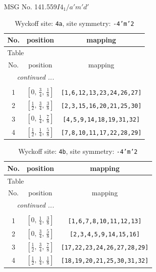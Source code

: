 \documentclass[fleqn,8pt]{jsarticle}
\begin{document}
\setcounter{MaxMatrixCols}{32}

\renewcommand{\tablename}{Table~}
\renewcommand{\figurename}{Figure~}
\begin{center}
\LARGE
MSG No. 141.559\quad$I4_{1}/a'm'd'$
\end{center}
\renewcommand{\arraystretch}{1.2}
\begin{longtable}{ccc}
\caption{Wyckoff site: {\tt 4a}, site symmetry: {\tt -4'm'2}}
 \\
 \hline \hline
No. & position & mapping \\ \hline \endfirsthead

\multicolumn{2}{l}{\tablename\ \thetable{}} \\
 \hline \hline
No. & position & mapping \\ \hline \endhead

 \hline \hline
\multicolumn{2}{r}{\footnotesize\it continued ...} \\ \endfoot

 \hline \hline
\multicolumn{2}{r}{} \\ \endlastfoot

1 & $\left[ 0,\, \frac{3}{4},\, \frac{1}{8} \right]$ & {\tt [1,6,12,13,23,24,26,27]} \\ \hline
2 & $\left[ \frac{1}{2},\, \frac{3}{4},\, \frac{3}{8} \right]$ & {\tt [2,3,15,16,20,21,25,30]} \\ \hline
3 & $\left[ 0,\, \frac{1}{4},\, \frac{7}{8} \right]$ & {\tt [4,5,9,14,18,19,31,32]} \\ \hline
4 & $\left[ \frac{1}{2},\, \frac{1}{4},\, \frac{5}{8} \right]$ & {\tt [7,8,10,11,17,22,28,29]} \\
\end{longtable}
\renewcommand{\arraystretch}{1.2}
\begin{longtable}{ccc}
\caption{Wyckoff site: {\tt 4b}, site symmetry: {\tt -4'm'2}}
 \\
 \hline \hline
No. & position & mapping \\ \hline \endfirsthead

\multicolumn{2}{l}{\tablename\ \thetable{}} \\
 \hline \hline
No. & position & mapping \\ \hline \endhead

 \hline \hline
\multicolumn{2}{r}{\footnotesize\it continued ...} \\ \endfoot

 \hline \hline
\multicolumn{2}{r}{} \\ \endlastfoot

1 & $\left[ 0,\, \frac{1}{4},\, \frac{3}{8} \right]$ & {\tt [1,6,7,8,10,11,12,13]} \\ \hline
2 & $\left[ 0,\, \frac{3}{4},\, \frac{5}{8} \right]$ & {\tt [2,3,4,5,9,14,15,16]} \\ \hline
3 & $\left[ \frac{1}{2},\, \frac{3}{4},\, \frac{7}{8} \right]$ & {\tt [17,22,23,24,26,27,28,29]} \\ \hline
4 & $\left[ \frac{1}{2},\, \frac{1}{4},\, \frac{1}{8} \right]$ & {\tt [18,19,20,21,25,30,31,32]} \\
\end{longtable}
\end{document}
